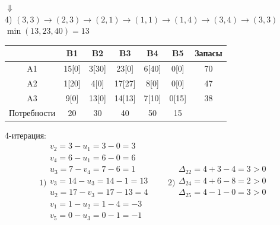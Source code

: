 \documentclass[a4paper, 12pt]{article}
\begin{document}
\begin{center}
  $\Downarrow$\\
  4) $(3,3)\rightarrow(2,3)\rightarrow(2,1)\rightarrow(1,1)\rightarrow(1,4)\rightarrow(3,4)\rightarrow(3,3)$\\
  $\min(13,23,40) = 13$
\end{center}
\begin{table}[H]
\centering
\begin{tabular}{|c|c|c|c|c|c|c|}
\hline
     & B1       & B2       & B3        & B4        & B5        & Запасы \\ \hline
A1   & 15[0]    & 3[30]    & 23[0]     & 6[40]     & 0[0]      & 70     \\ \hline
A2   & 1[20]    & 4[0]     & 17[27]    & 8[0]      & 0[0]      & 47     \\ \hline
A3   & 9[0]     & 13[0]    & 14[13]    & 7[10]     & 0[15]     & 38     \\ \hline
Потребности & 20       & 30       & 40        & 50        & 15        &        \\ \hline
\end{tabular}
\end{table}

4-итерация:\\
\begin{equation*}
  1)\begin{split}
    v_2= 3 - u_1 = 3-0 = 3\\
    v_4= 6 - u_1 = 6-0 = 6\\
    u_3= 7 - v_4 = 7-6 = 1\\
    v_3= 14 - u_3 = 14-1 = 13\\
    u_2= 17 - v_3 = 17-13 = 4\\
    v_1= 1 - u_2 = 1-4 = -3\\
    v_5= 0 - u_3 = 0-1 = -1\\
  \end{split}
  \qquad  
  2)\begin{split}
    \Delta_{22} =4+3-4=3> 0 \\
    \Delta_{24} =4+6-8=2> 0 \\
    \Delta_{25} =4-1-0=3> 0 \\
  \end{split}
\end{equation*}
\end{document}
